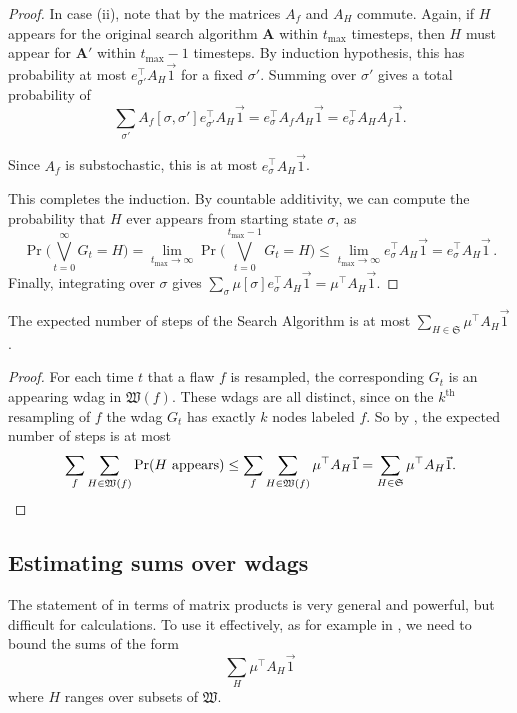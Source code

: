 \documentclass{toc}
\begin{document}
\begin{proof}
In case (ii), note that by  the matrices $A_f$ and $A_H$ commute. Again, if $H$ appears for the original search algorithm $\mathbf A$ within $t_{\max}$ timesteps, then   $H$ must appear for $\mathbf A'$ within $t_{\max}-1$ timesteps. By induction hypothesis, this has  probability at most $e_{\sigma'}^{\top} A_H \vec 1$ for a fixed $\sigma'$. Summing over $\sigma'$ gives a total probability of 
$$
\sum_{\sigma'} A_f[\sigma, \sigma'] e_{\sigma'}^{\top} A_{H} \vec 1 = e_{\sigma}^{\top} A_f  A_{H} \vec 1 = e_{\sigma}^{\top} A_H A_f \vec 1.
$$

Since $A_f$ is substochastic, this is at most $e_{\sigma}^{\top} A_H \vec 1$.

This completes the induction. By countable additivity, we can compute the probability that $H$ ever appears from starting state $\sigma$, as 
$$
\Pr \bigl( \bigvee_{t=0}^{\infty} G_t = H \bigr)= \lim_{t_{\max} \rightarrow \infty} \Pr \bigl( \bigvee_{t=0}^{t_{\max}-1} G_t = H \bigr) \leq  \lim_{t_{\max} \rightarrow \infty} e_{\sigma}^{\top} A_H \vec 1 = e_{\sigma}^{\top} A_H \vec 1\,.
$$
Finally, integrating over $\sigma$ gives $\sum_{\sigma} \mu[\sigma] e_{\sigma}^{\top} A_H \vec 1 =  \mu^{\top} A_H \vec 1$.
\end{proof}


\begin{corollary}
\label{stepscor}
The expected number of steps of the Search Algorithm is at most $ \sum_{H \in \mathfrak S} \mu^{\top} A_H \vec 1$. 
\end{corollary}
\begin{proof}
  For each time $t$ that a flaw  $f$ is resampled, the corresponding $G_t$ is an appearing wdag in $\mathfrak W(f)$. These wdags are all  distinct, since on the $k^{\text{th}}$ resampling of $f$ the wdag $G_t$ has exactly $k$ nodes labeled $f$. So by
%
%
,   %
%
the expected number of steps is at most \[
\sum_f \sum_{H \in \mathfrak W(f)} \Pr(\text{$H$ appears}) \leq \sum_f \sum_{H \in \mathfrak W(f)} \mu^{\top} A_H \vec 1 = \sum_{H \in \mathfrak S} \mu^{\top} A_H \vec 1. \qedhere
\]
\end{proof}


\subsection{Estimating sums over wdags}
\label{sec-est}
The statement of  
in terms of matrix products is very general and powerful, but difficult for calculations.  To use it effectively, as for example in , we need to bound the sums of the form
$$
  \sum_{H}  \mu^{\top} A_H \vec 1
$$
where $H$ ranges over subsets of $\mathfrak W$. 
\end{document}
